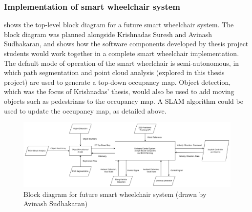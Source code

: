 \subsubsection{Implementation of smart wheelchair system}

 shows the top-level block diagram for a future
smart wheelchair system. The block diagram was planned alongside Krishnadas Suresh and
Avinash Sudhakaran, and shows how the software components developed by thesis project students
would work together in a complete smart wheelchair implementation. The default mode of operation
of the smart wheelchair is semi-autonomous, in which path segmentation and point cloud analysis
(explored in this thesis project) are used to generate a top-down occupancy map. Object detection,
which was the focus of Krishnadas' thesis, would also be used to add moving objects such as
pedestrians to the occupancy map. A SLAM algorithm could be used to update the occupancy map, as detailed above.

\begin{landscape}
\begin{figure}[p]
    \centering
    \includegraphics[width=\linewidth]{images/top_level_software_pipeline.png}
    \caption{Block diagram for future smart wheelchair system (drawn by Avinash Sudhakaran)}
    \label{fig:top_level_software_pipeline}
\end{figure}
\end{landscape}



